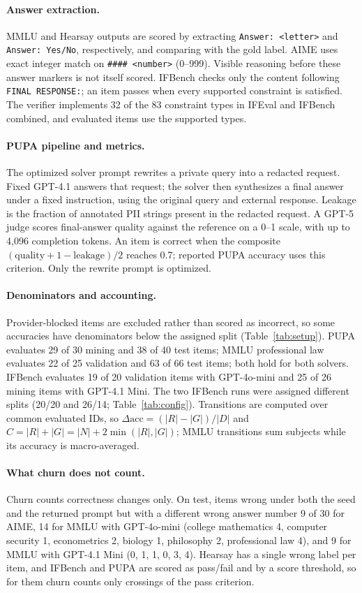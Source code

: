\documentclass[11pt]{article}
\begin{document}
\paragraph{Answer extraction.}
MMLU and Hearsay outputs are scored by extracting \texttt{Answer: <letter>} and \texttt{Answer: Yes/No}, respectively,
and comparing with the gold label. AIME uses exact integer match on \texttt{\#\#\#\# <number>} (0--999). Visible
reasoning before these answer markers is not itself scored. IFBench checks only the content following
\texttt{FINAL RESPONSE:}; an item passes when every supported constraint is satisfied. The verifier implements 32
of the 83 constraint types in IFEval and IFBench combined, and evaluated items use the supported types.

\paragraph{PUPA pipeline and metrics.}
The optimized solver prompt rewrites a private query into a redacted request. Fixed GPT-4.1 answers that request;
the solver then synthesizes a final answer under a fixed instruction, using the original query and external response.
Leakage is the fraction of annotated PII strings present in the redacted request. A GPT-5 judge scores final-answer
quality against the reference on a 0--1 scale, with up to 4,096 completion tokens. An item is correct when the
composite $(\text{quality}+1-\text{leakage})/2$ reaches 0.7; reported PUPA accuracy uses this criterion. Only the
rewrite prompt is optimized.

\paragraph{Denominators and accounting.}
Provider-blocked items are excluded rather than scored as incorrect, so some accuracies have denominators below the
assigned split (Table~\ref{tab:setup}). PUPA evaluates 29 of 30 mining and 38 of 40 test items; MMLU professional law
evaluates 22 of 25 validation and 63 of 66 test items; both hold for both solvers. IFBench evaluates 19 of 20
validation items with GPT-4o-mini and 25 of 26 mining items with GPT-4.1 Mini. The two IFBench runs were assigned
different splits (20/20 and 26/14; Table~\ref{tab:config}). Transitions are computed over common evaluated IDs, so
$\Delta\mathrm{acc}=(|R|-|G|)/|D|$ and $C=|R|+|G|=|N|+2\min(|R|,|G|)$; MMLU transitions sum subjects while its
accuracy is macro-averaged.

\paragraph{What churn does not count.}
Churn counts correctness changes only. On test, items wrong under both the seed and the returned prompt but with a
different wrong answer number 9 of 30 for AIME, 14 for MMLU with GPT-4o-mini (college mathematics 4, computer security
1, econometrics 2, biology 1, philosophy 2, professional law 4), and 9 for MMLU with GPT-4.1 Mini (0, 1, 1, 0, 3, 4).
Hearsay has a single wrong label per item, and IFBench and PUPA are scored as pass/fail and by a score threshold, so
for them churn counts only crossings of the pass criterion.
\end{document}
